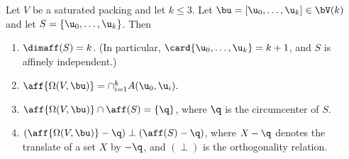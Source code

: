 \begin{lemma}[]\label{lemma:aff-center} 
Let $V$ be a saturated packing and let $k\le 3$.
Let $\bu=[\u_0,\ldots,\u_k]\in \bV(k)$ and let $S = \{\u_0,\ldots,\u_k\}$.
Then
\begin{enumerate} 
\item $\dimaff (S)= k$.  
(In particular, $\card\{\u_0,\ldots,\u_k\}=k+1$, and
$S$ is affinely independent.)
\item $\aff{\Omega(V,\bu)}= \cap_{i=1}^k A(\u_0,\u_i).$
\item $\aff{\Omega(V,\bu)} \cap \aff(S) = \{\q\}$, 
where $\q$ is the circumcenter of $S$.
\item $(\aff{\Omega(V,\bu)}-\q) \perp (\aff(S)-\q)$, where
  $X-\q$ denotes the translate of a set $X$ by $-\q$, and $(\perp)$ is
  the orthogonality relation.
\end{enumerate}
\end{lemma}


